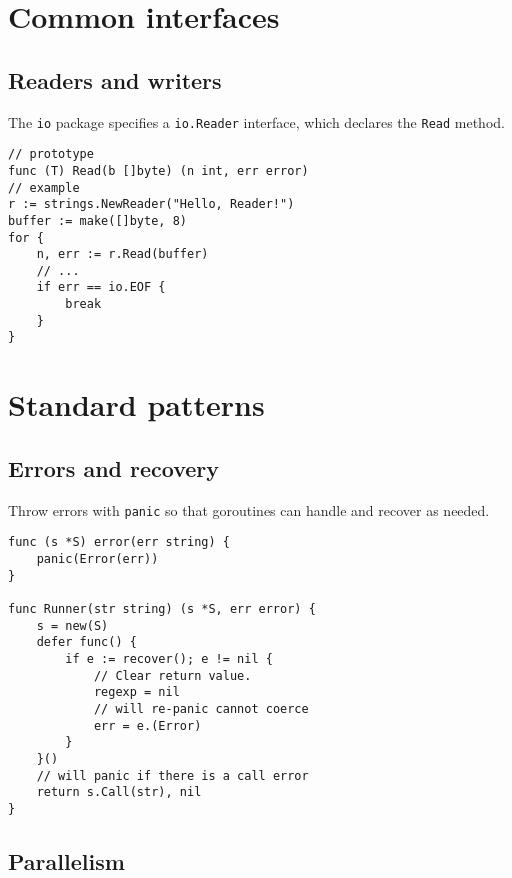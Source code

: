 \documentclass{article}
\begin{document}
\section{Common interfaces}

\subsection{Readers and writers}

\begin{paracol}{2}
The \lstinline|io| package specifies a \lstinline|io.Reader| interface, which declares the \lstinline|Read| method.

\switchcolumn

\begin{lstlisting}
// prototype
func (T) Read(b []byte) (n int, err error)
// example
r := strings.NewReader("Hello, Reader!")
buffer := make([]byte, 8)
for {
    n, err := r.Read(buffer)
    // ...
    if err == io.EOF {
        break
    }
}
\end{lstlisting}


\end{paracol}

\section{Standard patterns}

\subsection{Errors and recovery}
\begin{paracol}{2}

\noindent Throw errors with \lstinline|panic| so that goroutines can handle and recover as needed.

\switchcolumn

\begin{lstlisting}
func (s *S) error(err string) {
    panic(Error(err))
}

func Runner(str string) (s *S, err error) {
    s = new(S)
    defer func() {
        if e := recover(); e != nil {
            // Clear return value.
            regexp = nil    
            // will re-panic cannot coerce
            err = e.(Error) 
        }
    }()
    // will panic if there is a call error
    return s.Call(str), nil
}
\end{lstlisting}
\end{paracol}

\subsection{Parallelism}
\end{document}
